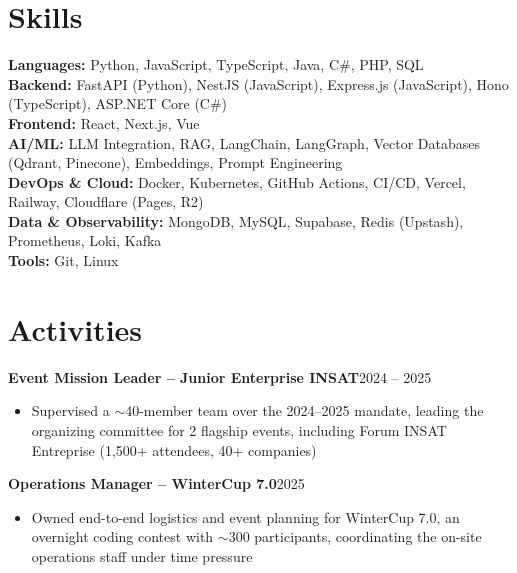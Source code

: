 \documentclass[10pt,a4paper]{article}
\newcommand{\entry}[2]{\vspace{1pt}\noindent\textbf{#1}\hfill{\color{muted}#2}\par}
\begin{document}
\section{Skills}
\textbf{Languages:} Python, JavaScript, TypeScript, Java, C\#, PHP, SQL\\
\textbf{Backend:} FastAPI (Python), NestJS (JavaScript), Express.js (JavaScript), Hono (TypeScript), ASP.NET Core (C\#)\\
\textbf{Frontend:} React, Next.js, Vue\\
\textbf{AI/ML:} LLM Integration, RAG, LangChain, LangGraph, Vector Databases (Qdrant, Pinecone), Embeddings, Prompt Engineering\\
\textbf{DevOps \& Cloud:} Docker, Kubernetes, GitHub Actions, CI/CD, Vercel, Railway, Cloudflare (Pages, R2)\\
\textbf{Data \& Observability:} MongoDB, MySQL, Supabase, Redis (Upstash), Prometheus, Loki, Kafka\\
\textbf{Tools:} Git, Linux

\section{Activities}
\entry{Event Mission Leader -- Junior Enterprise INSAT}{2024 -- 2025}
\begin{itemize}
  \item Supervised a $\sim$40-member team over the 2024--2025 mandate, leading the organizing committee for 2 flagship events, including Forum INSAT Entreprise (1,500+ attendees, 40+ companies)
\end{itemize}
\entry{Operations Manager -- WinterCup 7.0}{2025}
\begin{itemize}
  \item Owned end-to-end logistics and event planning for WinterCup 7.0, an overnight coding contest with $\sim$300 participants, coordinating the on-site operations staff under time pressure
\end{itemize}
\end{document}
